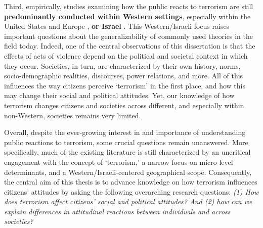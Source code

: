 Third, empirically, studies examining how the public reacts to terrorism are still \textbf{predominantly conducted within Western settings}, especially within the United States \citep[see, e.g., the prominent books of][]{Albertson2015, Davis2007, Merolla2009a,Pyszczynski2003} and Europe \citep[e.g.,][]{Legewie2013, Nussio2019, Castanhosilva2018}, \textbf{or Israel} \citep[e.g.,][see also Chapter 5 for an empirical proof of this argument]{Kalagy2017, Canetti2009, Halperin2009b, Hall2009, Feinstein2018}. This Western/Israeli focus raises important questions about the generalizability of commonly used theories in the field today. Indeed, one of the central observations of this dissertation is that the effects of acts of violence depend on the political and societal context in which they occur. Societies, in turn, are characterized by their own history, norms, socio-demographic realities, discourses, power relations, and more. All of this influences the way citizens perceive ‘terrorism’ in the first place, and how this may change their social and political attitudes. Yet, our knowledge of how terrorism changes citizens and societies across different, and especially within non-Western, societies remains very limited. 


Overall, despite the ever-growing interest in and importance of understanding public reactions to terrorism, some crucial questions remain unanswered. More specifically, much of the existing literature is still characterized by an uncritical engagement with the concept of `terrorism,' a narrow focus on micro-level determinants, and a Western/Israeli-centered geographical scope. Consequently, the central aim of this thesis is to advance knowledge on how terrorism influences citizens' attitudes by asking the following overarching research questions: \textit{(1) How does terrorism affect citizens' social and political attitudes? And (2) how can we explain differences in attitudinal reactions between individuals and across societies?}


